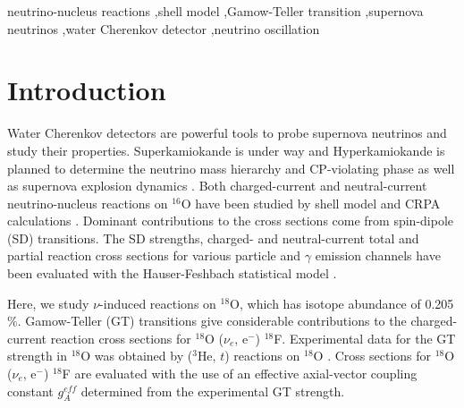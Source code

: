 \documentclass[preprint,12pt]{elsarticle}
\begin{document}
\begin{frontmatter}
\begin{keyword}
neutrino-nucleus reactions \sep shell model \sep Gamow-Teller transition \sep supernova neutrinos \sep water Cherenkov detector \sep neutrino oscillation


\end{keyword}

\end{frontmatter}


\section{Introduction}
\label{s1}
Water Cherenkov detectors are powerful tools to probe supernova neutrinos and study their properties.
Superkamiokande \cite{superK} is under way and Hyperkamiokande \cite{hyperK} is planned 
to determine the neutrino mass hierarchy and CP-violating phase as well as supernova explosion dynamics \cite{Langanke}.
Both charged-current and neutral-current neutrino-nucleus reactions on $^{16}$O have been studied by shell model \cite{SC2018} and CRPA calculations \cite{KL}. 
Dominant contributions to the cross sections come from spin-dipole (SD) transitions.
The SD strengths, charged- and neutral-current total and partial reaction cross sections for various particle and $\gamma$ emission channels have been evaluated with the Hauser-Feshbach statistical model \cite{SC2018,KL}. 

Here, we study $\nu$-induced reactions on $^{18}$O, which has isotope abundance of 0.205$\%$. 
Gamow-Teller (GT) transitions give considerable contributions to the charged-current reaction cross sections for $^{18}$O ($\nu_{e}$, e$^{-}$) $^{18}$F.
Experimental data for the GT strength in $^{18}$O was obtained by ($^{3}$He, $t$) reactions on $^{18}$O \cite{ox18gt}.
Cross sections for $^{18}$O ($\nu_{e}$, e$^{-}$) $^{18}$F are evaluated with the use of an effective axial-vector coupling constant $g_A^{eff}$ determined from the experimental GT strength.
\end{document}
